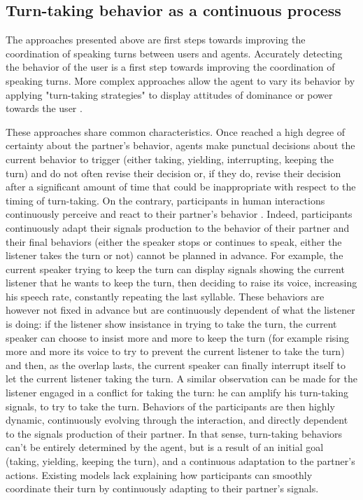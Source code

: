 \subsection{Turn-taking behavior as a continuous process }

The approaches presented above are first steps towards improving the coordination of speaking turns between users and agents. Accurately detecting the behavior of the user is a first step towards improving the coordination of speaking turns. More complex approaches allow the agent to vary its behavior by applying "turn-taking strategies" \citep{ter_maat_how_2010} to display attitudes of dominance or power towards the user \citep{ravenet_conversational_2015,cafaro_effects_2016}. %

These approaches share common characteristics. Once reached a high degree of certainty about the partner's behavior, agents make punctual decisions about the current behavior to trigger (either taking, yielding, interrupting, keeping the turn) and do not often revise their decision or, if they do, revise their decision after a significant amount of time that could be inappropriate with respect to the timing of turn-taking.
On the contrary, participants in human interactions continuously perceive and react to their partner's behavior \citep{clancy_co-constructed_2015}. Indeed, participants continuously adapt their signals production to the behavior of their partner and their final behaviors (either the speaker stops or continues to speak, either the listener takes the turn or not) cannot be planned in advance. For example, the current speaker trying to keep the turn can display signals showing the current listener that he wants to keep the turn, then deciding to raise its voice, increasing his speech rate, constantly repeating the last syllable. These behaviors are however not fixed in advance but are continuously dependent of what the listener is doing: if the listener show insistance in trying to take the turn, the current speaker can choose to insist more and more to keep the turn (for example rising more and more its voice to try to prevent the current listener to take the turn) and then, as the overlap lasts, the current speaker can finally interrupt itself to let the current listener taking the turn.  
A similar observation can be made for the listener engaged in a conflict for taking the turn: he can amplify his turn-taking signals, to try to take the turn.
 Behaviors of the participants are then highly dynamic, continuously evolving through the interaction, and directly dependent to the signals production of their partner. In that sense, turn-taking behaviors can't be entirely determined by the agent, but is a result of an initial goal (taking, yielding, keeping the turn), and a continuous adaptation to the partner's actions. Existing models lack explaining how participants can smoothly coordinate their turn by continuously adapting to their partner's signals.  
 
